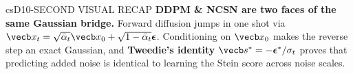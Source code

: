 \documentclass[../../../../master.tex]{subfiles}
\begin{document}
\begin{cscolumns}
\begin{cscard}{csD}{10-SECOND VISUAL RECAP}
  \sffamily\footnotesize
  \textbf{DDPM \& NCSN are two faces of the same Gaussian bridge.}
  Forward diffusion jumps in one shot via $\vecb x_t=\sqrt{\bar\alpha_t}\vecb x_0+\sqrt{1-\bar\alpha_t}\boldsymbol\epsilon$.
  Conditioning on $\vecb x_0$ makes the reverse step an exact Gaussian, and \textbf{Tweedie's identity} $\vecb s^*=-\boldsymbol\epsilon^*/\sigma_t$ proves that predicting added noise is identical to learning the Stein score across noise scales.
\end{cscard}
\end{cscolumns}

\csend
\end{document}
